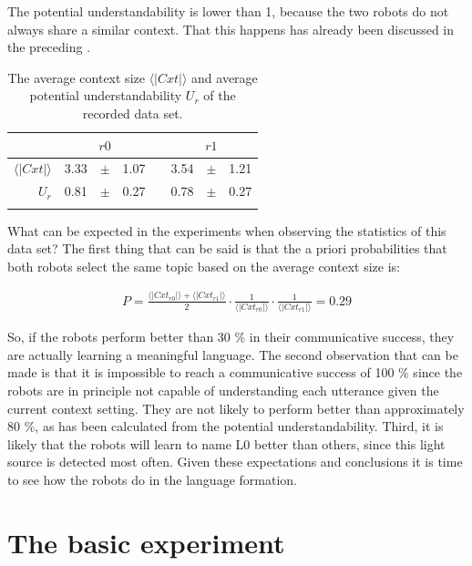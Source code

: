 The potential understandability is lower than 1, because the two robots do not always share a similar context. That this happens has already been discussed in the preceding .

\begin{table}
\centering
\begin{tabular}{rd{3}@{~}c@{~}d{3}c@{~}d{3}@{~}c@{~}d{3}}
\lsptoprule
 &  & & \\\midrule
$\langle|Cxt|\rangle$ & 3.33 & $\pm$ & 1.07 & & 3.54 & $\pm$ & 1.21\\
$U_r$ & 0.81 & $\pm$ & 0.27 & & 0.78 & $\pm$ & 0.27\\
\lspbottomrule
\end{tabular}
\caption{The average context size $\langle|Cxt|\rangle$ and average potential understandability $U_r$ of the recorded data set.}
\label{t:st:data}
\end{table}


What can be expected in the experiments when observing the statistics of this data set? The first thing that can be said is that the a priori probabilities that both robots select the same topic based on the average context size is:

\begin{eqnarray*}
P=\frac{\langle|Cxt_{r0}|\rangle+\langle|Cxt_{r1}|\rangle}{2}\cdot \frac{1}{\langle|Cxt_{r0}|\rangle} \cdot \frac{1}{\langle|Cxt_{r1}|\rangle}=0.29
\end{eqnarray*}


So, if the robots perform better than 30 \% in their communicative success, they are actually learning a meaningful language. The second observation that can be made is that it is impossible to reach a communicative success of 100 \% since the robots are in principle not capable of understanding each utterance given the current context setting. They are not likely to perform better than approximately 80 \%, as has been calculated from the potential understandability. Third, it is likely that the robots will learn to name L0 better than others, since this light source is detected most often. Given these expectations and conclusions it is time to see how the robots do in the language formation.


\section{The basic experiment}\label{s:st:experiment}

